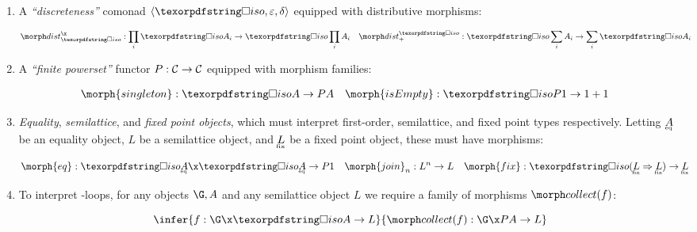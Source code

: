 \documentclass{rntz}\usepackage{fantasy}%
\begin{document}
\begin{enumerate}
\item A \emph{``discreteness''} comonad $\tuple{\disco{}, \varepsilon, \delta}$
  equipped with distributive morphisms:

  \nopagebreak[2]
  \begin{align*}
    \discox &: \prod_i \discof{A_i} \to \disco \prod_i A_i
    &
    \discosum &: \disco \sum_i A_i \to \sum_i \discof{A_i}
  \end{align*}

\item A \emph{``finite powerset''} functor \(P : \mathcal{C} \to \mathcal{C}\) equipped
  with morphism families:

  \nopagebreak[2]
  \begin{align*}
    \morph{singleton} &: \isof A \to \pfinof{A} &
    \morph{isEmpty} &: \discof{\pfinof{\termO}} \to \termO + \termO
  \end{align*}


\item \emph{Equality}, \emph{semilattice}, and \emph{fixed point objects}, which
  must interpret first-order, semilattice, and fixed point types respectively.
  Letting $\eqt A$ be an equality object, $L$ be a semilattice object, and
  $\fixt L$ be a fixed point object, these must have morphisms:

  \nopagebreak[2]
  \begin{align*}
    \morph{eq} &: \isof{\eqt A} \x \isof{\eqt A} \to \pfinof\termO
    &
    \morph{join}_n &: L^n \to L
    &
    \morph{fix} &: \isof{(\expO{\fixt L}{\fixt L})} \to \fixt L
  \end{align*}

\item To interpret -loops, for any objects $\G, A$ and any
  semilattice object $L$ we require a family of morphisms $\pcollect{f}$:

  \nopagebreak[2]
  \[
    \infer{f : \G \x \isof A \to L}
          {\pcollect{f} : \G \x \pfinof{A} \to L}
  \]


\end{enumerate}
\end{document}
